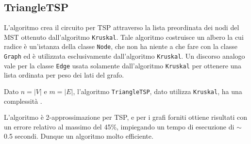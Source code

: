 \subsection{TriangleTSP}

L'algoritmo crea il circuito per TSP attraverso la lista preordinata dei nodi del MST ottenuto dall'algoritmo \texttt{Kruskal}. Tale algoritmo costruisce un albero la cui radice è un'istanza della classe \texttt{Node}, che non ha niente a che fare con la classe \texttt{Graph} ed è utilizzata esclusivamente dall'algoritmo \texttt{Kruskal}. Un discorso analogo vale per la classe \texttt{Edge} usata solamente dall'algoritmo \texttt{Kruskal} per ottenere una lista ordinata per peso dei lati del grafo.

Dato $n=|V|$ e $m=|E|$, l'algoritmo \texttt{TriangleTSP}, dato utilizza \texttt{Kruskal}, ha una complessità .

L'algoritmo è 2-approssimazione per TSP, e per i grafi forniti ottiene risultati con un errore relativo al massimo del 45\%, impiegando un tempo di esecuzione di $\sim$0.5 secondi. Dunque un algoritmo molto efficiente.

